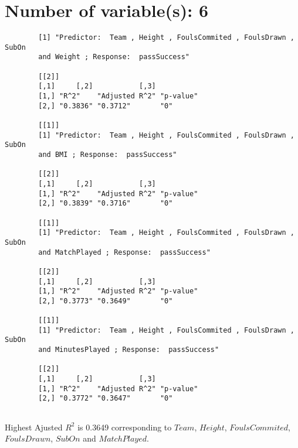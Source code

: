 \documentclass[12pt]{article}
\begin{document}
	\section{Number of variable(s): 6}
	\begin{verbatim}
		[1] "Predictor:  Team , Height , FoulsCommited , FoulsDrawn , SubOn 
		and Weight ; Response:  passSuccess"
		
		[[2]]
		[,1]     [,2]           [,3]     
		[1,] "R^2"    "Adjusted R^2" "p-value"
		[2,] "0.3836" "0.3712"       "0"      
		
		[[1]]
		[1] "Predictor:  Team , Height , FoulsCommited , FoulsDrawn , SubOn 
		and BMI ; Response:  passSuccess"
		
		[[2]]
		[,1]     [,2]           [,3]     
		[1,] "R^2"    "Adjusted R^2" "p-value"
		[2,] "0.3839" "0.3716"       "0"      
		
		[[1]]
		[1] "Predictor:  Team , Height , FoulsCommited , FoulsDrawn , SubOn 
		and MatchPlayed ; Response:  passSuccess"
		
		[[2]]
		[,1]     [,2]           [,3]     
		[1,] "R^2"    "Adjusted R^2" "p-value"
		[2,] "0.3773" "0.3649"       "0"      
		
		[[1]]
		[1] "Predictor:  Team , Height , FoulsCommited , FoulsDrawn , SubOn 
		and MinutesPlayed ; Response:  passSuccess"
		
		[[2]]
		[,1]     [,2]           [,3]     
		[1,] "R^2"    "Adjusted R^2" "p-value"
		[2,] "0.3772" "0.3647"       "0" 
		
	\end{verbatim}
	Highest Ajusted $ R^2 $ is 0.3649 corresponding to $ Team $, $ Height $, $ FoulsCommited $, $ FoulsDrawn $, $ SubOn $ and	$ MatchPlayed $.
	
\end{document}
